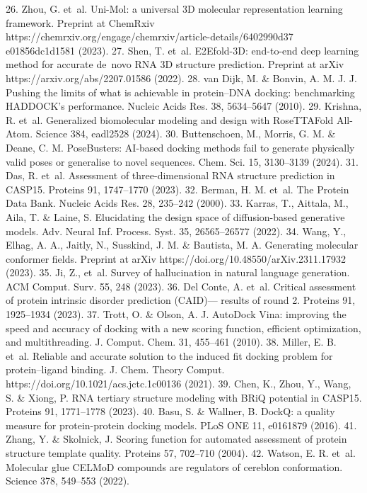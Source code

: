 26.	 Zhou, G. et al. Uni-Mol: a universal 3D molecular representation learning framework.
Preprint at ChemRxiv https://chemrxiv.org/engage/chemrxiv/article-details/6402990d37
e01856dc1d1581 (2023).
27.
Shen, T. et al. E2Efold-3D: end-to-end deep learning method for accurate de novo RNA 3D
structure prediction. Preprint at arXiv https://arxiv.org/abs/2207.01586 (2022).
28.	 van Dijk, M. \& Bonvin, A. M. J. J. Pushing the limits of what is achievable in protein–DNA
docking: benchmarking HADDOCK’s performance. Nucleic Acids Res. 38, 5634–5647
(2010).
29.	 Krishna, R. et al. Generalized biomolecular modeling and design with RoseTTAFold
All-Atom. Science 384, eadl2528 (2024).
30.	 Buttenschoen, M., Morris, G. M. \& Deane, C. M. PoseBusters: AI-based docking methods
fail to generate physically valid poses or generalise to novel sequences. Chem. Sci. 15,
3130–3139 (2024).
31.
Das, R. et al. Assessment of three-dimensional RNA structure prediction in CASP15.
Proteins 91, 1747–1770 (2023).
32.	 Berman, H. M. et al. The Protein Data Bank. Nucleic Acids Res. 28, 235–242 (2000).
33.	 Karras, T., Aittala, M., Aila, T. \& Laine, S. Elucidating the design space of diffusion-based
generative models. Adv. Neural Inf. Process. Syst. 35, 26565–26577 (2022).
34.	 Wang, Y., Elhag, A. A., Jaitly, N., Susskind, J. M. \& Bautista, M. A. Generating molecular
conformer fields. Preprint at arXiv https://doi.org/10.48550/arXiv.2311.17932 (2023).
35.	 Ji, Z., et al. Survey of hallucination in natural language generation. ACM Comput. Surv.
55, 248 (2023).
36.	 Del Conte, A. et al. Critical assessment of protein intrinsic disorder prediction (CAID)—
results of round 2. Proteins 91, 1925–1934 (2023).
37.
Trott, O. \& Olson, A. J. AutoDock Vina: improving the speed and accuracy of docking with
a new scoring function, efficient optimization, and multithreading. J. Comput. Chem. 31,
455–461 (2010).
38.	 Miller, E. B. et al. Reliable and accurate solution to the induced fit docking problem for
protein–ligand binding. J. Chem. Theory Comput. https://doi.org/10.1021/acs.jctc.1c00136
(2021).
39.	 Chen, K., Zhou, Y., Wang, S. \& Xiong, P. RNA tertiary structure modeling with BRiQ potential
in CASP15. Proteins 91, 1771–1778 (2023).
40.	 Basu, S. \& Wallner, B. DockQ: a quality measure for protein-protein docking models. PLoS
ONE 11, e0161879 (2016).
41.
Zhang, Y. \& Skolnick, J. Scoring function for automated assessment of protein structure
template quality. Proteins 57, 702–710 (2004).
42.	 Watson, E. R. et al. Molecular glue CELMoD compounds are regulators of cereblon
conformation. Science 378, 549–553 (2022).
